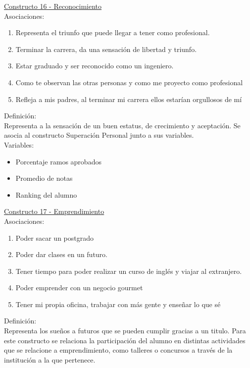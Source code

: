 \underline {Constructo 16 - Reconocimiento} \\
Asociaciones:
\begin{enumerate}
	\item Representa el triunfo que puede llegar a tener como profesional.
	\item Terminar la carrera, da una sensación de libertad y triunfo. 
	\item Estar graduado y ser reconocido como un ingeniero.
	\item Como te observan las otras personas y como me proyecto como profesional	
	\item Refleja a mis padres, al terminar mi carrera ellos estarían orgullosos de mí
\end{enumerate}

Definición:\\
Representa a la sensación de un buen estatus, de crecimiento y aceptación. Se asocia al constructo Superación Personal junto a sus variables.\\

Variables:
\begin{itemize}
	\item Porcentaje ramos aprobados
	\item Promedio de notas
	\item Ranking del alumno	
\end{itemize} 

\underline {Constructo 17 - Emprendimiento} \\
Asociaciones:
\begin{enumerate}
	\item Poder sacar un postgrado
	\item Poder dar clases en un futuro.
	\item Tener tiempo para poder realizar un curso de inglés y viajar al extranjero.
	\item Poder emprender con un negocio gourmet
	\item Tener mi propia oficina, trabajar con más gente y enseñar lo que sé	
\end{enumerate}

Definición:\\
Representa los sueños a futuros que se pueden cumplir gracias a un titulo. Para este constructo se relaciona la participación del alumno en distintas actividades que se relacione a emprendimiento, como talleres o concursos a través de la institución a la que pertenece.\\

